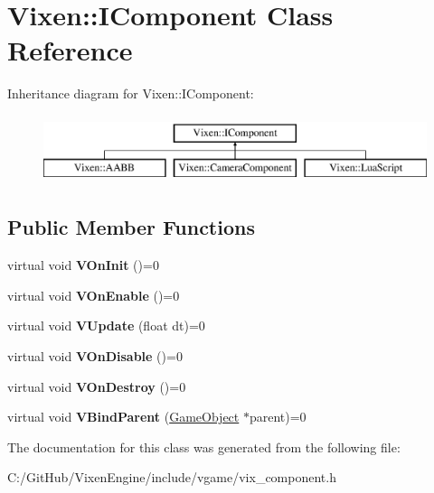 \hypertarget{class_vixen_1_1_i_component}{}\section{Vixen\+:\+:I\+Component Class Reference}
\label{class_vixen_1_1_i_component}
Inheritance diagram for Vixen\+:\+:I\+Component\+:\begin{figure}[H]
\begin{center}
\leavevmode
\includegraphics[height=2.000000cm]{class_vixen_1_1_i_component}
\end{center}
\end{figure}
\subsection*{Public Member Functions}
\begin{DoxyCompactItemize}
\item 
\hypertarget{class_vixen_1_1_i_component_a04ff32534e21d0c1563934ba97e0615b}{}virtual void {\bfseries V\+On\+Init} ()=0\label{class_vixen_1_1_i_component_a04ff32534e21d0c1563934ba97e0615b}

\item 
\hypertarget{class_vixen_1_1_i_component_a5de956cbf077dae45b2c6cb965d41bfe}{}virtual void {\bfseries V\+On\+Enable} ()=0\label{class_vixen_1_1_i_component_a5de956cbf077dae45b2c6cb965d41bfe}

\item 
\hypertarget{class_vixen_1_1_i_component_a2a7577ab0665c4b0036bba4388770664}{}virtual void {\bfseries V\+Update} (float dt)=0\label{class_vixen_1_1_i_component_a2a7577ab0665c4b0036bba4388770664}

\item 
\hypertarget{class_vixen_1_1_i_component_adbf5ac429985cbd048dc5e64db579a50}{}virtual void {\bfseries V\+On\+Disable} ()=0\label{class_vixen_1_1_i_component_adbf5ac429985cbd048dc5e64db579a50}

\item 
\hypertarget{class_vixen_1_1_i_component_afe1563ecde4893048d5bab759e486032}{}virtual void {\bfseries V\+On\+Destroy} ()=0\label{class_vixen_1_1_i_component_afe1563ecde4893048d5bab759e486032}

\item 
\hypertarget{class_vixen_1_1_i_component_a1f4d8a4a8bc2bc906a74f96be4409434}{}virtual void {\bfseries V\+Bind\+Parent} (\hyperlink{class_vixen_1_1_game_object}{Game\+Object} $\ast$parent)=0\label{class_vixen_1_1_i_component_a1f4d8a4a8bc2bc906a74f96be4409434}

\end{DoxyCompactItemize}


The documentation for this class was generated from the following file\+:\begin{DoxyCompactItemize}
\item 
C\+:/\+Git\+Hub/\+Vixen\+Engine/include/vgame/vix\+\_\+component.\+h\end{DoxyCompactItemize}
